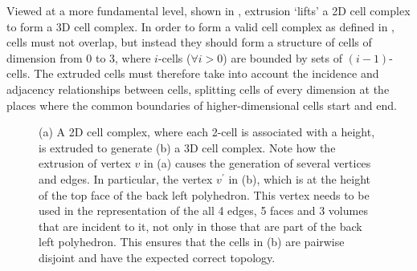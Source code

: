 Viewed at a more fundamental level, shown in , extrusion `lifts' a 2D cell complex to form a 3D cell complex.
In order to form a valid cell complex as defined in , cells must not overlap, but instead they should form a structure of cells of dimension from 0 to 3, where $i$-cells ($\forall i > 0$) are bounded by sets of $(i-1)$-cells.
The extruded cells must therefore take into account the incidence and adjacency relationships between cells, splitting cells of every dimension at the places where the common boundaries of higher-dimensional cells start and end.
\begin{figure}[tbp]
\centering
{}
{}
\caption[Extrusion from 2D to 3D]{(a) A 2D cell complex, where each 2-cell is associated with a height, is extruded to generate (b) a 3D cell complex. Note how the extrusion of vertex $v$ in (a) causes the generation of several vertices and edges.
In particular, the vertex $v^\prime$ in (b), which is at the height of the top face of the back left polyhedron.
This vertex needs to be used in the representation of the all 4 edges, 5 faces and 3 volumes that are incident to it, not only in those that are part of the back left polyhedron. This ensures that the cells in (b) are pairwise disjoint and have the expected correct topology.}
\label{fig:extrusion}
\end{figure}

